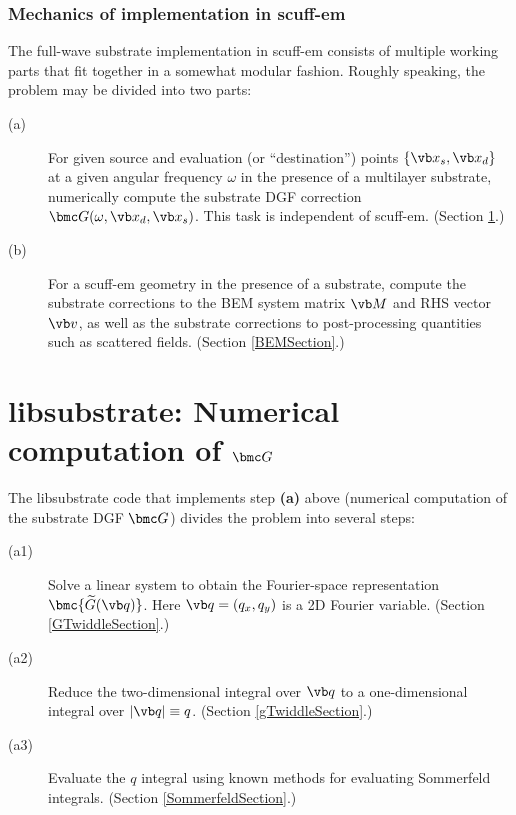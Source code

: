 \documentclass[letterpaper]{article}
\renewcommand{\wt}{\widetilde}
\begin{document}
\subsubsection*{Mechanics of implementation in {\sc scuff-em}}

The full-wave substrate implementation in {\sc scuff-em}
consists of multiple working parts that fit together
in a somewhat modular fashion.
Roughly speaking, the problem may be divided into two parts:
\begin{description}
  \item[(a)] For given source and evaluation (or ``destination'')
             points $\{\vb x_s, \vb x_d\}$ at a given angular frequency
             $\omega$ in the presence of a multilayer substrate,
             numerically compute the substrate DGF correction
             $\bmc G(\omega, \vb x_d, \vb x_s)$.
             This task is independent of {\sc scuff-em}.
             (Section \ref{ScriptGComputationSection}.)
  \item[(b)] For a {\sc scuff-em} geometry in the presence of a
             substrate, compute the substrate corrections to the BEM
             system matrix $\vb M$ and RHS vector $\vb v$,
             as well as the substrate corrections
             to post-processing quantities such as scattered fields.
             (Section \ref{BEMSection}.)
\end{description}

\newpage
\section{{\sc libsubstrate:} Numerical computation of $\bmc G$}
\label{ScriptGComputationSection}

The {\sc libsubstrate} code that implements step \textbf{(a)} above 
(numerical computation of the substrate DGF $\bmc G$) 
divides the problem into several steps:

\begin{description}
 \item[(a1)] Solve a linear system to obtain the Fourier-space
             representation $\bmc{\wt G(\vb q)}$. Here $\vb q=(q_x,q_y)$ is a
             2D Fourier variable. (Section \ref{GTwiddleSection}.)
 \item[(a2)] Reduce the two-dimensional integral over $\vb q$ to a
             one-dimensional integral over $|\vb q|\equiv q$.
             (Section \ref{gTwiddleSection}.)
 \item[(a3)] Evaluate the $q$ integral using known methods for
             evaluating Sommerfeld integrals.
             (Section \ref{SommerfeldSection}.)
\end{description}
\end{document}
